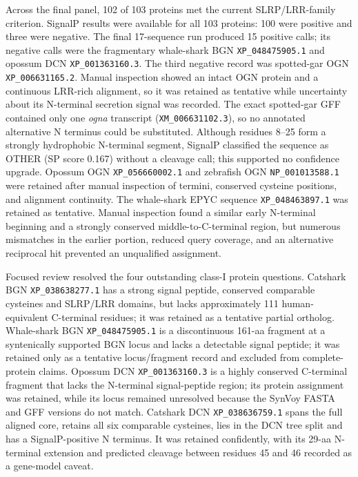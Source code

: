 Across the final panel, 102 of 103 proteins met the current SLRP/LRR-family
criterion. SignalP results were available for all 103 proteins: 100 were
positive and three were negative. The final 17-sequence run produced 15
positive calls; its negative calls were the fragmentary whale-shark BGN
\texttt{XP\_048475905.1} and opossum DCN \texttt{XP\_001363160.3}. The third
negative record was spotted-gar OGN \texttt{XP\_006631165.2}. Manual inspection
showed an intact OGN protein and a continuous LRR-rich alignment, so it was
retained as tentative while uncertainty about its N-terminal secretion signal
was recorded. The exact spotted-gar GFF contained only one \textit{ogna}
transcript (\texttt{XM\_006631102.3}), so no annotated alternative N terminus
could be substituted. Although residues 8--25 form a strongly hydrophobic
N-terminal segment, SignalP classified the sequence as OTHER (SP score 0.167)
without a cleavage call; this supported no confidence upgrade. Opossum OGN
\texttt{XP\_056660002.1} and zebrafish OGN \texttt{NP\_001013588.1} were
retained after manual inspection of termini, conserved cysteine positions, and
alignment continuity. The whale-shark EPYC sequence
\texttt{XP\_048463897.1} was retained as tentative. Manual inspection found a
similar early N-terminal beginning and a strongly conserved
middle-to-C-terminal region, but numerous mismatches in the earlier portion,
reduced query coverage, and an alternative reciprocal hit prevented an
unqualified assignment.

Focused review resolved the four outstanding class-I protein questions.
Catshark BGN \texttt{XP\_038638277.1} has a strong signal peptide, conserved
comparable cysteines and SLRP/LRR domains, but lacks approximately 111
human-equivalent C-terminal residues; it was retained as a tentative partial
ortholog. Whale-shark BGN \texttt{XP\_048475905.1} is a discontinuous 161-aa
fragment at a syntenically supported BGN locus and lacks a detectable signal
peptide; it was retained only as a tentative locus/fragment record and excluded
from complete-protein claims. Opossum DCN \texttt{XP\_001363160.3} is a highly
conserved C-terminal fragment that lacks the N-terminal signal-peptide region;
its protein assignment was retained, while its locus remained unresolved
because the SynVoy FASTA and GFF versions do not match. Catshark DCN
\texttt{XP\_038636759.1} spans the full aligned core, retains all six comparable
cysteines, lies in the DCN tree split and has a SignalP-positive N terminus. It
was retained confidently, with its 29-aa N-terminal extension and predicted
cleavage between residues 45 and 46 recorded as a gene-model caveat.

